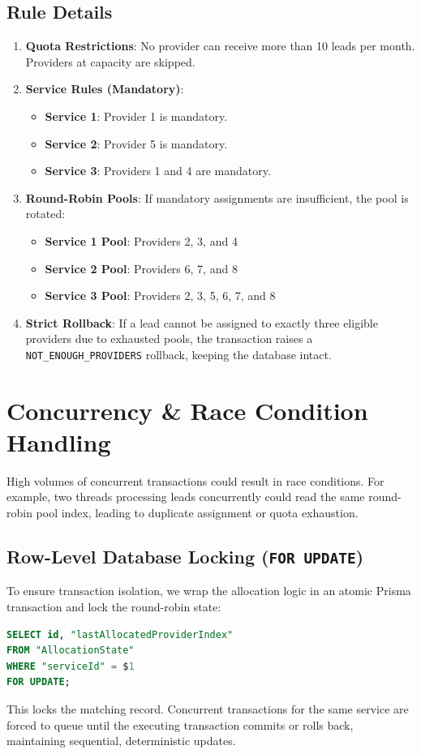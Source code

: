\documentclass[11pt,a4paper]{article}
\begin{document}
\subsection{Rule Details}
\begin{enumerate}
    \item \textbf{Quota Restrictions}: No provider can receive more than 10 leads per month. Providers at capacity are skipped.
    \item \textbf{Service Rules (Mandatory)}:
    \begin{itemize}
        \item \textbf{Service 1}: Provider 1 is mandatory.
        \item \textbf{Service 2}: Provider 5 is mandatory.
        \item \textbf{Service 3}: Providers 1 and 4 are mandatory.
    \end{itemize}
    \item \textbf{Round-Robin Pools}: If mandatory assignments are insufficient, the pool is rotated:
    \begin{itemize}
        \item \textbf{Service 1 Pool}: Providers 2, 3, and 4
        \item \textbf{Service 2 Pool}: Providers 6, 7, and 8
        \item \textbf{Service 3 Pool}: Providers 2, 3, 5, 6, 7, and 8
    \end{itemize}
    \item \textbf{Strict Rollback}: If a lead cannot be assigned to exactly three eligible providers due to exhausted pools, the transaction raises a \texttt{NOT\_ENOUGH\_PROVIDERS} rollback, keeping the database intact.
\end{enumerate}

\newpage

\section{Concurrency & Race Condition Handling}

High volumes of concurrent transactions could result in race conditions. For example, two threads processing leads concurrently could read the same round-robin pool index, leading to duplicate assignment or quota exhaustion.

\subsection{Row-Level Database Locking (\texttt{FOR UPDATE})}
To ensure transaction isolation, we wrap the allocation logic in an atomic Prisma transaction and lock the round-robin state:
\begin{lstlisting}[language=SQL]
SELECT id, "lastAllocatedProviderIndex" 
FROM "AllocationState" 
WHERE "serviceId" = $1 
FOR UPDATE;
\end{lstlisting}
This locks the matching record. Concurrent transactions for the same service are forced to queue until the executing transaction commits or rolls back, maintaining sequential, deterministic updates.
\end{document}
